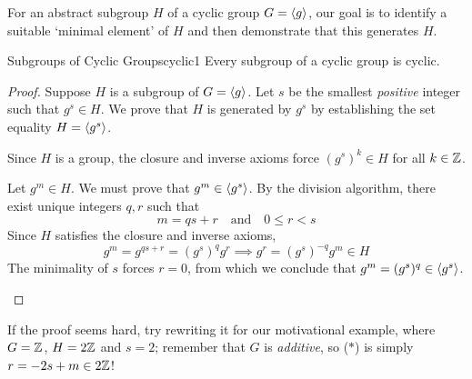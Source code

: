 For an abstract subgroup $H$ of a cyclic group $G=\left\langle g\right\rangle$, our goal is to identify a suitable `minimal element' of $H$ and then demonstrate that this generates $H$.

\begin{thm}{Subgroups of Cyclic Groups}{cyclic1}
	Every subgroup of a cyclic group is cyclic.
\end{thm}

\begin{proof}
	Suppose $H$ is a subgroup of $G=\left\langle g\right\rangle$. Let $s$ be the smallest \emph{positive} integer\footnotemark{} such that $g^s\in H$.
	We prove that $H$ is generated by $g^s$ by establishing the set equality $H=\left\langle g^s\right\rangle$.
	\begin{description}\itemsep0pt
		\item[$(\supseteq)$] Since $H$ is a group, the closure and inverse axioms force $(g^s)^k\in H$ for all $k\in\mathbb{Z}$.
		\item[$(\subseteq)$] Let $g^m\in H$. We must prove that $g^m\in\left\langle g^s\right\rangle$. By the division algorithm, there exist unique integers $q,r$ such that
		\[
			m=qs+r\quad\text{and}\quad 0\le r<s
		\]
		Since $H$ satisfies the closure and inverse axioms,
		\[
			g^m=g^{qs+r}=(g^s)^qg^r\implies g^r=(g^s)^{-q}g^m\in H \tag{$\ast$}
		\]
		The minimality of $s$ forces $r=0$, from which we conclude that $g^m=(g^s)^q\in\left\langle g^s\right\rangle$.\qedhere 
	\end{description}
\end{proof}



If the proof seems hard, try rewriting it for our motivational example, where $G=\mathbb{Z}$, $H=2\mathbb{Z}$ and $s=2$; remember that $G$ is \emph{additive}, so ($\ast$) is simply $r=-2s+m\in 2\mathbb{Z}$!

\medskip

